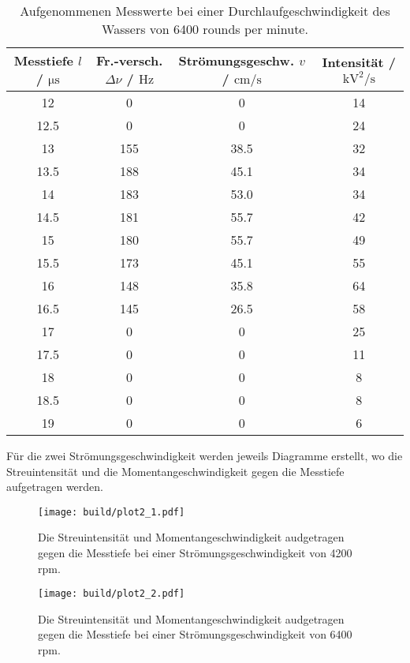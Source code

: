 \begin{table}
  \centering
  \begin{tabular}{c | c | c | c}
    \toprule
    Messtiefe $l$ / $\si{\micro\second}$ & Fr.-versch. $\Delta \nu$ / $\si{\hertz}$ & Strömungsgeschw. $v$ / $\si{\centi\meter\per\second}$ & Intensität / $\si{\kilo\volt\squared\per\second}$ \\
    \midrule
    12          &    0      &     0          &     14\\
    12.5        &    0      &     0          &     24\\
    13          &    155    &     38.5       &     32\\
    13.5        &    188    &     45.1       &     34\\
    14          &    183    &     53.0       &     34\\
    14.5        &    181    &     55.7       &     42\\
    15          &    180    &     55.7       &     49\\
    15.5        &    173    &     45.1       &     55\\
    16          &    148    &     35.8       &     64\\
    16.5        &    145    &     26.5       &     58\\          
    17          &    0      &     0          &     25\\
    17.5        &    0     &      0          &     11\\
    18          &    0     &      0          &     8\\
    18.5        &    0     &      0          &     8\\
    19          &    0     &      0          &     6\\
    \bottomrule
  \end{tabular}
  \caption{Aufgenommenen Messwerte bei einer Durchlaufgeschwindigkeit des Wassers von 6400 rounds per minute.}
  \label{tab:Teil2_70}
\end{table}

Für die zwei Strömungsgeschwindigkeit werden jeweils Diagramme erstellt, wo die Streuintensität
und die Momentangeschwindigkeit gegen die Messtiefe aufgetragen werden.\\

\begin{figure}
  \centering
  \texttt{[image: build/plot2\_1.pdf]}
  \caption{Die Streuintensität und Momentangeschwindigkeit audgetragen gegen die Messtiefe bei
  einer Strömungsgeschwindigkeit von 4200 rpm.}
  \label{fig:stroemung}
\end{figure}

\begin{figure}
  \centering
  \texttt{[image: build/plot2\_2.pdf]}
  \caption{Die Streuintensität und Momentangeschwindigkeit audgetragen gegen die Messtiefe bei
  einer Strömungsgeschwindigkeit von 6400 rpm.}
  \label{fig:stroemung}
\end{figure}